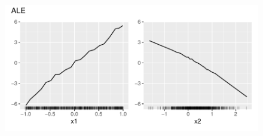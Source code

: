 {\begin{enumerate}[a)]
\begin{enumerate}
\begin{figure}[!ht]
  \centering
  \includegraphics[width=\maxwidth]{figure/ALE_Plot.pdf}
  \end{figure}


\end{enumerate}
\end{enumerate}
}
